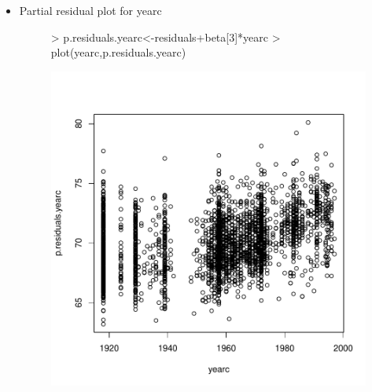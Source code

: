 \documentclass[12pt]{article}
\begin{document}
\begin{itemize}
\item Partial residual plot for yearc
\begin{figure}[H]
\begin{Schunk}
\begin{Sinput}
> p.residuals.yearc<-residuals+beta[3]*yearc
> plot(yearc,p.residuals.yearc)
\end{Sinput}
\end{Schunk}
\includegraphics{HW3-047}
\end{figure}
\clearpage


\end{itemize}
\end{document}
